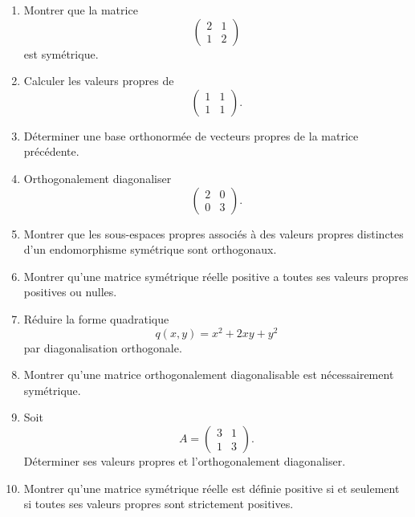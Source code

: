 \documentclass[11pt,a4paper]{article}
\theoremstyle{remark}
\begin{document}
\begin{enumerate}[label=\textbf{Exercice \arabic*.}]
    \item Montrer que la matrice
    \[
    \begin{pmatrix}
    2 & 1\\
    1 & 2
    \end{pmatrix}
    \]
    est symétrique.

    \item Calculer les valeurs propres de
    \[
    \begin{pmatrix}
    1 & 1\\
    1 & 1
    \end{pmatrix}.
    \]

    \item Déterminer une base orthonormée de vecteurs propres de la matrice précédente.

    \item Orthogonalement diagonaliser
    \[
    \begin{pmatrix}
    2 & 0\\
    0 & 3
    \end{pmatrix}.
    \]

    \item Montrer que les sous-espaces propres associés à des valeurs propres distinctes d’un endomorphisme symétrique sont orthogonaux.

    \item Montrer qu’une matrice symétrique réelle positive a toutes ses valeurs propres positives ou nulles.

    \item Réduire la forme quadratique
    \[
    q(x,y)=x^2+2xy+y^2
    \]
    par diagonalisation orthogonale.

    \item Montrer qu’une matrice orthogonalement diagonalisable est nécessairement symétrique.

    \item Soit
    \[
    A=
    \begin{pmatrix}
    3 & 1\\
    1 & 3
    \end{pmatrix}.
    \]
    Déterminer ses valeurs propres et l’orthogonalement diagonaliser.

    \item Montrer qu’une matrice symétrique réelle est définie positive si et seulement si toutes ses valeurs propres sont strictement positives.
\end{enumerate}
\end{document}
